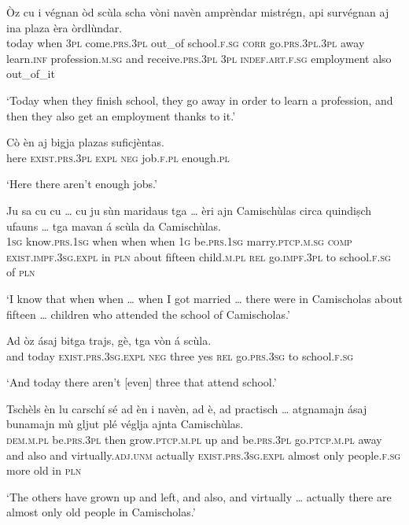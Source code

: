 \begin{linenumbers}
	\gll    Òz cu i végnan òd scùla scha vòni navèn  amprèndar mistrégn, api survégnan aj ina plaza èra òrdlùndar.\\
	today when \textsc{3pl} come.\textsc{prs.3pl} out\_of school.\textsc{f.sg} \textsc{corr} go.\textsc{prs.3pl.3pl} away learn.\textsc{inf} profession.\textsc{m.sg} and   receive.\textsc{prs.3pl} \textsc{3pl} \textsc{indef.art.f.sg} employment  also out\_of\_it  \\
\end{linenumbers}
\medskip
\glt `Today when they finish school, they go away in order to learn a profession, and then they also get an employment thanks to it.'
\medskip

\begin{linenumbers}
	\gll    Cò èn aj bigja plazas suficjèntas.\\
	here \textsc{exist.prs.3pl} \textsc{expl} \textsc{neg} job.\textsc{f.pl} enough.\textsc{pl} \\
\end{linenumbers}
\medskip
\glt `Here there aren’t enough jobs.'
\medskip

\begin{linenumbers}
	\gll    Ju sa cu cu … cu ju sùn maridaus tga … èri ajn Camischùlas circa quindiṣch ufauns … tga mavan á scùla da Camischùlas.\\
	\textsc{1sg} know.\textsc{prs.1sg} when when {} when \textsc{1g} be.\textsc{prs.1sg}  marry.\textsc{ptcp.m.sg} \textsc{comp} {} \textsc{exist.impf.3sg.expl} in \textsc{pln} about fifteen child.\textsc{m.pl} {} \textsc{rel} go.\textsc{impf.3pl} to school.\textsc{f.sg} of  \textsc{pln}\\
\end{linenumbers}
\medskip
\glt `I know that when when … when I got married … there were in Camischolas about fifteen … children who attended the school of Camischolas.'
\medskip

\begin{linenumbers}
	\gll    Ad òz ásaj bitga trajs, gè, tga vòn á scùla.\\
	and today \textsc{exist.prs.3sg.expl} \textsc{neg} three yes \textsc{rel} go.\textsc{prs.3sg} to school.\textsc{f.sg}\\
\end{linenumbers}
\medskip
\glt `And today there aren’t [even] three that attend school.'
\medskip

\begin{linenumbers}
	\gll    Tschèls èn lu carschí sé ad èn i navèn, ad è, ad practisch … atgnamajn ásaj bunamajn mù gljut plé véglja ajnta Camischùlas.\\
	\textsc{dem.m.pl} be.\textsc{prs.3pl} then grow.\textsc{ptcp.m.pl} up and be.\textsc{prs.3pl} go.\textsc{ptcp.m.pl} away and also and virtually.\textsc{adj.unm} {} actually \textsc{exist.prs.3sg.expl} almost only people.\textsc{f.sg} more old in \textsc{pln}  \\
\end{linenumbers}
\medskip
\glt `The others have grown up and left, and also, and virtually … actually there are almost only old people in Camischolas.'
\medskip

